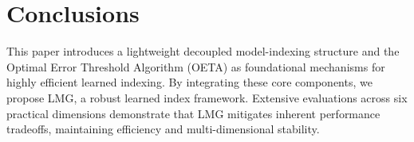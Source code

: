 




\section{Conclusions}
\label{sec:conclusions}


This paper introduces a lightweight decoupled model-indexing structure and the Optimal Error Threshold Algorithm (OETA) as foundational mechanisms for highly efficient learned indexing. By integrating these core components, we propose LMG, a robust learned index framework. Extensive evaluations across six practical dimensions demonstrate that LMG mitigates inherent performance tradeoffs, maintaining efficiency and multi-dimensional stability.

